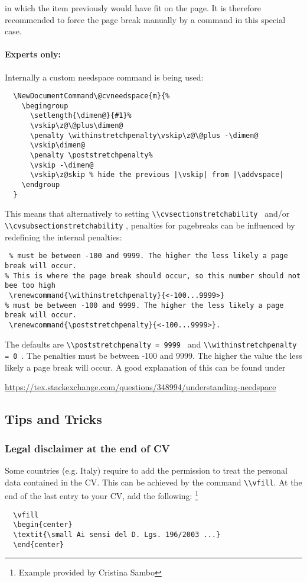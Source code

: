 \documentclass[a4paper,11pt]{article}
\newcommand{\code}[1]{\lstinline!#1!}
\newcommand{\Code}[1]{\lstinline!#1!~} %
\begin{document}
in which the item previously would have fit on the page. 
It is therefore recommended to force the page break manually by a \newpage command in this special case.

\paragraph{Experts only:}
Internally a custom needspace command is being used: 

\begin{lstlisting}
  \NewDocumentCommand\@cvneedspace{m}{%
    \begingroup
      \setlength{\dimen@}{#1}%
      \vskip\z@\@plus\dimen@
      \penalty \withinstretchpenalty\vskip\z@\@plus -\dimen@
      \vskip\dimen@
      \penalty \poststretchpenalty%
      \vskip -\dimen@
      \vskip\z@skip % hide the previous |\vskip| from |\addvspace|
    \endgroup
  }
\end{lstlisting}
This means that alternatively to setting \Code{\\cvsectionstretchability} and/or \code{\\cvsubsectionstretchability} , penalties for pagebreaks can be influenced by redefining the internal penalties:
\begin{lstlisting}
 % must be between -100 and 9999. The higher the less likely a page break will occur.
% This is where the page break should occur, so this number should not bee too high
 \renewcommand{\withinstretchpenalty}{<-100...9999>}
% must be between -100 and 9999. The higher the less likely a page break will occur.
 \renewcommand{\poststretchpenalty}{<-100...9999>}.
\end{lstlisting}
The defaults are \Code{\\poststretchpenalty = 9999} and \Code{\\withinstretchpenalty = 0}. 
The penalties must be between -100 and 9999. The higher the value the less likely a page break will occur. A good explanation of this can be found under 
\begin{center}
  \url{https://tex.stackexchange.com/questions/348994/understanding-needspace}
\end{center}



\subsection{Tips and Tricks}
\subsubsection{Legal disclaimer at the end of CV}
Some countries (e.g. Italy) require to add the permission to treat the personal data contained in the CV. This can be achieved by the command \code{\\vfill}. At the end of the last entry to your 
CV, add the following:%
\footnote{Example provided by Cristina Sambo} %
\begin{lstlisting}
  \vfill
  \begin{center} 
  \textit{\small Ai sensi del D. Lgs. 196/2003 ...}
  \end{center}
\end{lstlisting}
\end{document}
